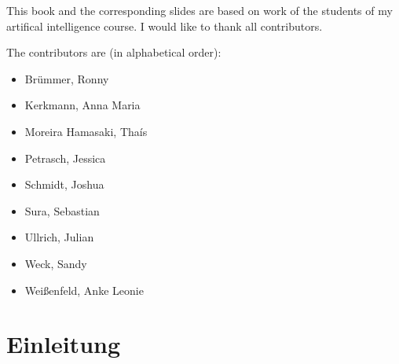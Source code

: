 \documentclass[11pt,fleqn]{book} %
\begin{document}


\newpage
\thispagestyle{empty}

\noindent This book and the corresponding slides are based on work of the students of my artifical intelligence course. I would like to thank all contributors.

\noindent
The contributors are (in alphabetical order):
\begin{itemize}
    \item Brümmer, Ronny
    \item Kerkmann, Anna Maria
    \item Moreira Hamasaki, Thaís
    \item Petrasch, Jessica
    \item Schmidt, Joshua
    \item Sura, Sebastian
    \item Ullrich, Julian
    \item Weck, Sandy
    \item Weißenfeld, Anke Leonie
\end{itemize}





\pagestyle{empty} %

\tableofcontents %

\cleardoublepage %

\pagestyle{fancy} %

\part{Einleitung}

\end{document}
